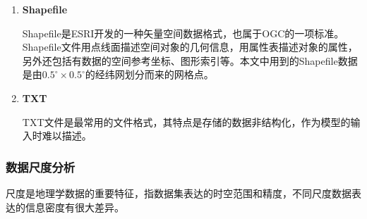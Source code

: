 \begin{enumerate}[(1)]
    \item \textbf{Shapefile}
    
    Shapefile是ESRI开发的一种矢量空间数据格式，也属于OGC的一项标准。Shapefile文件用点线面描述空间对象的几何信息，用属性表描述对象的属性，另外还包括有数据的空间参考坐标、图形索引等。本文中用到的Shapefile数据是由$0.5^{\circ} \times 0.5^{\circ}$的经纬网划分而来的网格点。

    \item \textbf{TXT}
    
    TXT文件是最常用的文件格式，其特点是存储的数据非结构化，作为模型的输入时难以描述。

\end{enumerate}

\subsubsection{数据尺度分析}
尺度是地理学数据的重要特征，指数据集表达的时空范围和精度，不同尺度数据表达的信息密度有很大差异。
